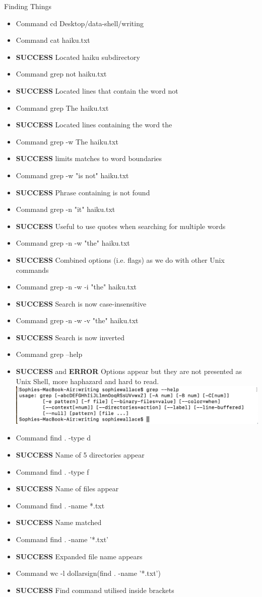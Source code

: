 \documentclass{article}
\begin{document}
Finding Things 
\begin{itemize}
\item Command cd Desktop/data-shell/writing
\item Command cat haiku.txt
\item \textbf{SUCCESS} Located haiku subdirectory
\item Command  grep not haiku.txt
\item \textbf{SUCCESS} Located lines that contain the word not
\item Command grep The haiku.txt
\item \textbf{SUCCESS} Located lines containing the word the
\item Command grep -w The haiku.txt
\item \textbf{SUCCESS} limits matches to word boundaries
\item Command grep -w "is not" haiku.txt
\item \textbf{SUCCESS} Phrase containing is not found
\item Command grep -n "it" haiku.txt
\item \textbf{SUCCESS} Useful to use quotes when searching for multiple words
\item Command grep -n -w "the" haiku.txt
\item \textbf{SUCCESS} Combined options (i.e. flags) as we do with other Unix commands
\item Command grep -n -w -i "the" haiku.txt
\item \textbf{SUCCESS} Search is now case-insensitive
\item Command grep -n -w -v "the" haiku.txt
\item \textbf{SUCCESS} Search is now inverted
\item Command grep --help
\item \textbf{SUCCESS} and \textbf{ERROR} Options appear but they are not presented as Unix Shell, more haphazard and hard to read. \\
\includegraphics[width=\textwidth]{Images/grep --help.png} \\
\item Command find . -type d
\item \textbf{SUCCESS} Name of 5 directories appear
\item Command find . -type f
\item \textbf{SUCCESS} Name of files appear 
\item Command find . -name *.txt
\item \textbf{SUCCESS} Name matched
\item Command  find . -name '*.txt'
\item \textbf{SUCCESS} Expanded file name appears
\item Command wc -l dollarsign(find . -name '*.txt')
\item \textbf{SUCCESS} Find command utilised inside brackets
\end{itemize}
\end{document}
